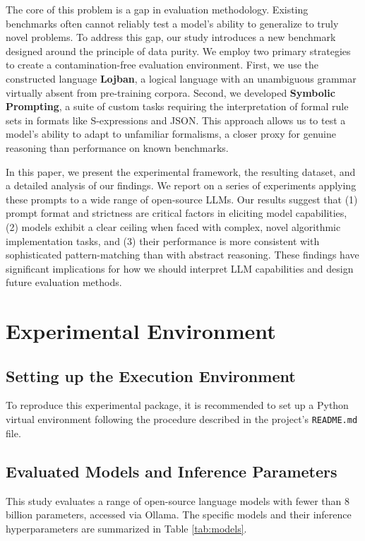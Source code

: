 \documentclass[11pt]{article}
\begin{document}
The core of this problem is a gap in evaluation methodology. Existing benchmarks often cannot reliably test a model's ability to generalize to truly novel problems. To address this gap, our study introduces a new benchmark designed around the principle of data purity. We employ two primary strategies to create a contamination-free evaluation environment. First, we use the constructed language \textbf{Lojban}, a logical language with an unambiguous grammar virtually absent from pre-training corpora. Second, we developed \textbf{Symbolic Prompting}, a suite of custom tasks requiring the interpretation of formal rule sets in formats like S-expressions and JSON. This approach allows us to test a model's ability to adapt to unfamiliar formalisms, a closer proxy for genuine reasoning than performance on known benchmarks.

In this paper, we present the experimental framework, the resulting dataset, and a detailed analysis of our findings. We report on a series of experiments applying these prompts to a wide range of open-source LLMs. Our results suggest that (1) prompt format and strictness are critical factors in eliciting model capabilities, (2) models exhibit a clear ceiling when faced with complex, novel algorithmic implementation tasks, and (3) their performance is more consistent with sophisticated pattern-matching than with abstract reasoning. These findings have significant implications for how we should interpret LLM capabilities and design future evaluation methods.

\section{Experimental Environment}
\label{sec:environment}

\subsection{Setting up the Execution Environment}
To reproduce this experimental package, it is recommended to set up a Python virtual environment following the procedure described in the project's \texttt{README.md} file.

\subsection{Evaluated Models and Inference Parameters}
This study evaluates a range of open-source language models with fewer than 8 billion parameters, accessed via Ollama. The specific models and their inference hyperparameters are summarized in Table \ref{tab:models}.
\end{document}
